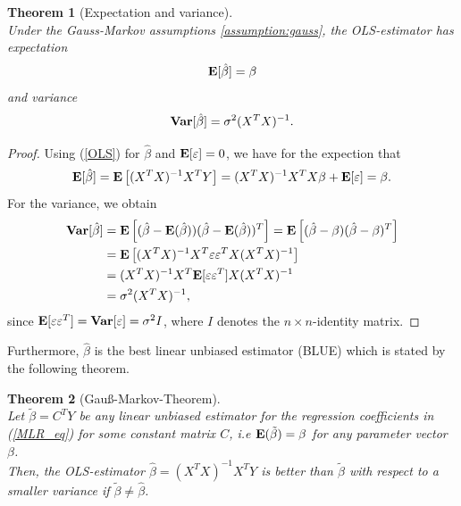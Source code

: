 \documentclass[a4paper, 12pt]{scrreprt}
\newtheorem{Theorem}{Theorem}[chapter]
\newcommand{\ew}{\mbox{\textbf{E}}}
\newcommand{\var}{\mbox{\textbf{Var}}}
\begin{document}
\begin{Theorem}[Expectation and variance] \upshape $\text{ }$ \\
Under the Gauss-Markov assumptions \ref{assumption:gauss}, the OLS-estimator has expectation
\begin{equation}\label{OLS:unbiased}
\ew[\hat{\beta}] = \beta
\end{equation}
and variance
\begin{equation}\label{OLS:variance}
\var[\hat{\beta}] = \sigma^2 (X^T X)^{-1}.
\end{equation}
\end{Theorem}
\begin{proof}
Using (\ref{OLS}) for $\hat{\beta}$ and $\ew[\varepsilon]=0$, we have for the expection that
\begin{equation*}
\ew[\hat{\beta}] = \ew \left[(X^T X)^{-1} X^T Y \right] = (X^T X)^{-1} X^T X \beta + \ew[\varepsilon] = \beta.
\end{equation*}
For the variance, we obtain
\begin{align*}
\var[\hat{\beta}] &= \ew \left[ (\hat{\beta} - \ew(\hat{\beta}))(\hat{\beta} - \ew(\hat{\beta}))^T \right] = \ew \left[ (\hat{\beta} - \beta)(\hat{\beta} - \beta)^T \right]  \\
&= \ew \left[ (X^T X)^{-1} X^T \varepsilon \varepsilon^T X (X^T X) ^{-1} \right]  \\
&= (X^T X)^{-1} X^T \ew[\varepsilon \varepsilon^T] X (X^T X) ^{-1}   \\
&= \sigma^2 (X^T X)^{-1},
\end{align*}
since $\ew[\varepsilon \varepsilon^T] = \var[\varepsilon] = \sigma^2 I$, where $I$ denotes the $n \times n$-identity matrix.
\end{proof}
Furthermore, $\hat{\beta}$ is the best linear unbiased estimator (BLUE) which is stated by the following theorem.

\begin{Theorem}[Gauß-Markov-Theorem] \label{gaussmarkov} $\text{ }$ \\ \upshape
Let $\tilde{\beta} = C^T Y$ be any linear unbiased estimator for the regression coefficients in (\ref{MLR_eq}) for some constant matrix $C$, i.e $\ew(\tilde{\beta}) = \beta$ for any parameter vector $\beta$. \\
Then, the OLS-estimator $\hat{\beta} = (X^T X)^{-1} X^T Y$ is better than $\tilde{\beta}$ with respect to a smaller variance if $\tilde{\beta} \neq \hat{\beta}$.
\end{Theorem}
\end{document}
